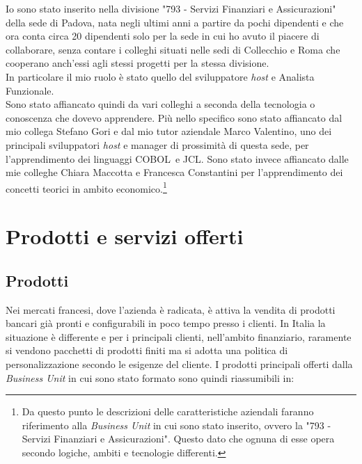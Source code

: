 Io sono stato inserito nella divisione "793 - Servizi Finanziari e Assicurazioni" della sede di Padova, nata negli ultimi anni a partire da pochi dipendenti e che ora conta circa 20 dipendenti solo per la sede in cui ho avuto il piacere di collaborare, senza contare i colleghi situati nelle sedi di Collecchio e Roma che cooperano anch'essi agli stessi progetti per la stessa divisione.\\
In particolare il mio ruolo è stato quello del sviluppatore \textit{host} e Analista Funzionale. \\
	Sono stato affiancato quindi da vari colleghi a seconda della tecnologia o conoscenza che dovevo apprendere. Più nello specifico sono stato affiancato dal mio collega Stefano Gori e dal mio tutor aziendale Marco Valentino, uno dei principali sviluppatori \textit{host} e manager di prossimità di questa sede, per l'apprendimento dei linguaggi COBOL\glossario\ e JCL\glossario. Sono stato invece affiancato dalle mie colleghe Chiara Maccotta e Francesca Constantini per l'apprendimento dei concetti teorici in ambito economico.\footnote{Da questo punto le descrizioni delle caratteristiche aziendali faranno riferimento alla \textit{Business Unit} in cui sono stato inserito, ovvero la "793 - Servizi Finanziari e Assicurazioni". Questo dato che ognuna di esse opera secondo logiche, ambiti e tecnologie differenti.}%


\section{Prodotti e servizi offerti}
	
	\subsection{Prodotti}
	
	Nei mercati francesi, dove l'azienda è radicata, è attiva la vendita di prodotti bancari già pronti e configurabili in poco tempo presso i clienti. In Italia la situazione è differente e per i principali clienti, nell'ambito finanziario, raramente si vendono pacchetti di prodotti finiti ma si adotta una politica di personalizzazione secondo le esigenze del cliente. I prodotti principali offerti dalla \textit{Business Unit} in cui sono stato formato sono quindi riassumibili in:
		
